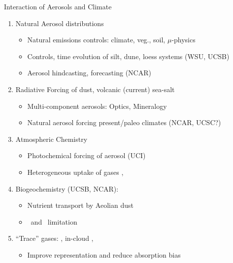 \documentclass[final,dvips]{foils}
\begin{document}
\rotatefoilhead{\bgl
\Large\textcolor{blue}{\hfill Future Directions/Opportunities \hfill}}\vspace{-0.5in}\large
Interaction of Aerosols and Climate
\begin{enumerate}
\item Natural Aerosol distributions
\begin{itemize}
\item Natural emissions controls: climate, veg., soil, $\mu$-physics
\item Controls, time evolution of silt, dune, loess systems (WSU, UCSB)
\item Aerosol hindcasting, forecasting (NCAR)
\end{itemize}
\item Radiative Forcing of dust, volcanic (current) sea-salt
\begin{itemize}
\item Multi-component aerosols: Optics, Mineralogy
\item Natural aerosol forcing present/paleo climates (NCAR, UCSC?)
\end{itemize}
\item Atmospheric Chemistry
\begin{itemize}
\item Photochemical forcing of aerosol (UCI)
\item Heterogeneous uptake of gases \HOx, \NOx
\end{itemize}
\item Biogeochemistry (UCSB, NCAR):
\begin{itemize}
\item Nutrient transport by Aeolian dust
\item \Fe\ and \Pu\ limitation
\end{itemize}
\item ``Trace'' gases: \NOd, in-cloud \HdO, \HdOHdO
\begin{itemize}
\item Improve representation and reduce absorption bias
\end{itemize}
\end{enumerate}
\end{document}
